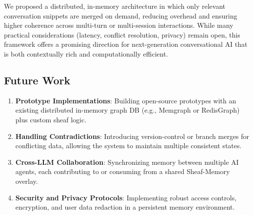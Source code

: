\documentclass{article}
\begin{document}
We proposed a distributed, in-memory architecture in which only relevant conversation snippets are merged on demand, reducing overhead and ensuring higher coherence across multi-turn or multi-session interactions. While many practical considerations (latency, conflict resolution, privacy) remain open, this framework offers a promising direction for next-generation conversational AI that is both contextually rich and computationally efficient.

\subsection*{Future Work}
\begin{enumerate}
    \item \textbf{Prototype Implementations}: Building open-source prototypes with an existing distributed in-memory graph DB (e.g., Memgraph or RedisGraph) plus custom sheaf logic.
    \item \textbf{Handling Contradictions}: Introducing version-control or branch merges for conflicting data, allowing the system to maintain multiple consistent states.
    \item \textbf{Cross-LLM Collaboration}: Synchronizing memory between multiple AI agents, each contributing to or consuming from a shared Sheaf-Memory overlay.
    \item \textbf{Security and Privacy Protocols}: Implementing robust access controls, encryption, and user data redaction in a persistent memory environment.
\end{enumerate}
\end{document}
